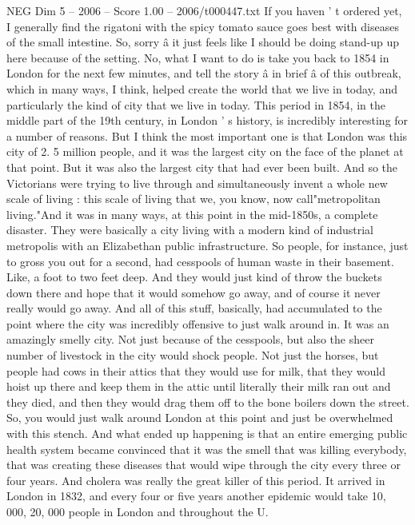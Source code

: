 \begin{textsample}{NEG Dim 5 – 2006 – Score 1.00 – 2006/t000447.txt}  \label{ex:f5_neg_063}
If you haven ' t ordered yet, I generally find the rigatoni with the spicy tomato sauce goes best with diseases of the small intestine.
So, sorry â it just feels like I should be doing stand-up up here because of the setting.
No, what I want to do is take you back to 1854 in London for the next few minutes, and tell the story â in brief â of this outbreak, which in many ways, I think, helped create the world that we live in today, and particularly the kind of city that we live in today.
This period in 1854, in the middle part of the 19th century, in London ' s history, is incredibly interesting for a number of reasons.
But I think the most important one is that London was this city of 2. 5 million people, and it was the largest city on the face of the planet at that point.
But it was also the largest city that had ever been built.
And so the Victorians were trying to live through and simultaneously invent a whole new scale of living : this scale of living that we, you know, now call"metropolitan living."And it was in many ways, at this point in the mid-1850s, a complete disaster.
They were basically a city living with a modern kind of industrial metropolis with an Elizabethan public infrastructure.
So people, for instance, just to gross you out for a second, had cesspools of human waste in their basement.
Like, a foot to two feet deep.
And they would just kind of throw the buckets down there and hope that it would somehow go away, and of course it never really would go away.
And all of this stuff, basically, had accumulated to the point where the city was incredibly offensive to just walk around in.
It was an amazingly smelly city.
Not just because of the cesspools, but also the sheer number of livestock in the city would shock people.
Not just the horses, but people had cows in their attics that they would use for milk, that they would hoist up there and keep them in the attic until literally their milk ran out and they died, and then they would drag them off to the bone boilers down the street.
So, you would just walk around London at this point and just be overwhelmed with this stench.
And what ended up happening is that an entire emerging public health system became convinced that it was the smell that was killing everybody, that was creating these diseases that would wipe through the city every three or four years.
And cholera was really the great killer of this period.
It arrived in London in 1832, and every four or five years another epidemic would take 10, 000, 20, 000 people in London and throughout the U.

\end{textsample}
